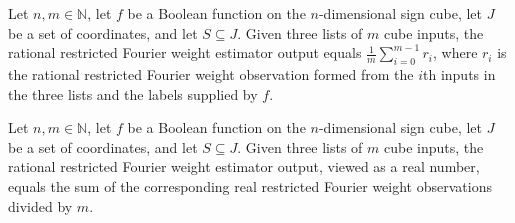 \begin{theorem}
\label{FABL.restrictedFourierWeightEstimatorOutput_eq_sum}
\leanok
{}
Let $n,m\in\mathbb N$, let $f$ be a Boolean function on the $n$-dimensional sign cube,
let $J$ be a set of coordinates, and let $S\subseteq J$. Given three lists of $m$ cube
inputs, the rational restricted Fourier weight estimator output equals
$\frac{1}{m}\sum_{i=0}^{m-1} r_i$, where $r_i$ is the rational restricted Fourier weight
observation formed from the $i$th inputs in the three lists and the labels supplied by
$f$.
\end{theorem}

\begin{theorem}
\label{FABL.restrictedFourierWeightEstimatorOutput_cast}
\leanok
{}
Let $n,m\in\mathbb N$, let $f$ be a Boolean function on the $n$-dimensional sign cube,
let $J$ be a set of coordinates, and let $S\subseteq J$. Given three lists of $m$ cube
inputs, the rational restricted Fourier weight estimator output, viewed as a real
number, equals the sum of the corresponding real restricted Fourier weight observations
divided by $m$.
\end{theorem}

